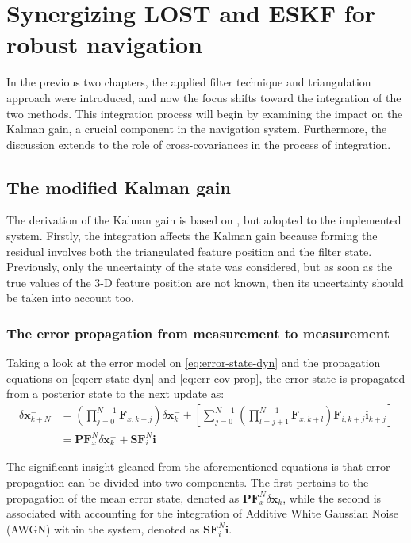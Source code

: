 \chapter{Synergizing LOST and ESKF for robust navigation}
\label{chap:integration}

In the previous two chapters, the applied filter technique and triangulation approach were introduced, and now the focus shifts toward the integration of the two methods. This integration process will begin by examining the impact on the Kalman gain, a crucial component in the navigation system. Furthermore, the discussion extends to the role of cross-covariances in the process of integration.

\section{The modified Kalman gain}

The derivation of the Kalman gain is based on \cite{discrete_kalman_tutorial}, but adopted to the implemented system. Firstly, the integration affects the Kalman gain because forming the residual involves both the triangulated feature position and the filter state. Previously, only the uncertainty of the state was considered, but as soon as the true values of the 3-D feature position are not known, then its uncertainty should be taken into account too.

\subsection{The error propagation from measurement to measurement}

Taking a look at the error model on \eqref{eq:error-state-dyn} and the propagation equations on \eqref{eq:err-state-dyn} and \eqref{eq:err-cov-prop}, the error state is propagated from a posterior state to the next update as:
\begin{equation}
\begin{aligned}
    \delta\mathbf{x}_{k+N}^- &= \left(\prod_{j=0}^{N-1}\mathbf{F}_{x,k+j}\right)\delta\mathbf{x}_k^- + \left[\sum_{j=0}^{N-1}\left(\prod_{l=j+1}^{N-1}\mathbf{F}_{x,k+l} \right) \mathbf{F}_{i,k+j} \mathbf{i}_{k+j}\right] \\ &= \mathbf{PF}_x^N\delta\mathbf{x}_k^- + \mathbf{SF}_i^N \mathbf{i} 
 \label{eq:true-err-state}
\end{aligned}
\end{equation}

The significant insight gleaned from the aforementioned equations is that error propagation can be divided into two components. The first pertains to the propagation of the mean error state, denoted as $\mathbf{PF}_x^N\delta\mathbf{x}_k$, while the second is associated with accounting for the integration of Additive White Gaussian Noise (AWGN) within the system, denoted as $\mathbf{SF}_i^N \mathbf{i}$.

